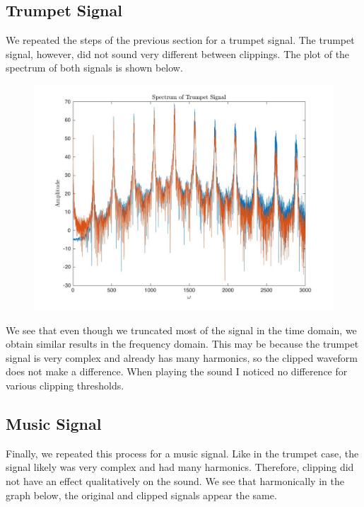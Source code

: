 \documentclass{article}
\begin{document}
\subsection{Trumpet Signal}
We repeated the steps of the previous section for a trumpet signal. The trumpet signal, however, did not sound very different between clippings. The plot of the spectrum of both signals is shown below. 
\begin{figure}[!htbp]
\begin{minipage}{\linewidth}
\includegraphics[width = 1\linewidth, height = 0.5\textheight]{trumpet1.jpg}
\end{minipage}
\end{figure}
We see that even though we truncated most of the signal in the time domain, we obtain similar results in the frequency domain. This may be because the trumpet signal is very complex and already has many harmonics, so the clipped waveform does not make a difference. When playing the sound I noticed no difference for various clipping thresholds.

\FloatBarrier
\subsection{Music Signal}
Finally, we repeated this process for a music signal. Like in the trumpet case, the signal likely was very complex and had many harmonics. Therefore, clipping did not have an effect qualitatively on the sound. We see that harmonically in the graph below, the original and clipped signals appear the same.
\end{document}
